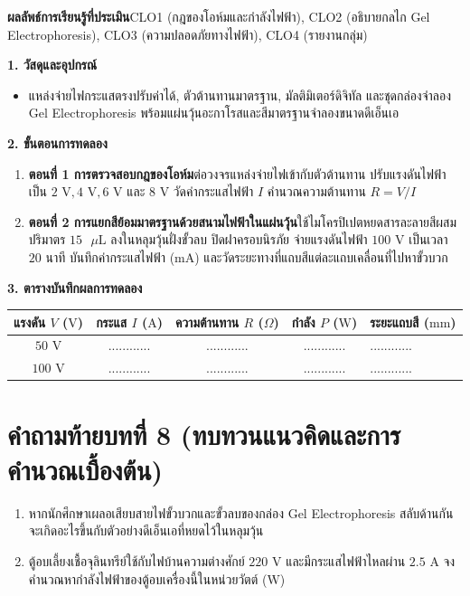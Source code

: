 \begin{labbox}
\noindent\textbf{ผลลัพธ์การเรียนรู้ที่ประเมิน}\quad CLO1 (กฎของโอห์มและกำลังไฟฟ้า), CLO2 (อธิบายกลไก Gel Electrophoresis), CLO3 (ความปลอดภัยทางไฟฟ้า), CLO4 (รายงานกลุ่ม)

\vspace{4pt}
\noindent\textbf{1. วัสดุและอุปกรณ์}
\begin{itemize}
    \item แหล่งจ่ายไฟกระแสตรงปรับค่าได้, ตัวต้านทานมาตรฐาน, มัลติมิเตอร์ดิจิทัล และชุดกล่องจำลอง Gel Electrophoresis พร้อมแผ่นวุ้นอะกาโรสและสีมาตรฐานจำลองขนาดดีเอ็นเอ
\end{itemize}

\noindent\textbf{2. ขั้นตอนการทดลอง}
\begin{enumerate}
    \item \textbf{ตอนที่ 1 การตรวจสอบกฎของโอห์ม}\quad ต่อวงจรแหล่งจ่ายไฟเข้ากับตัวต้านทาน ปรับแรงดันไฟฟ้าเป็น $2\text{ V}, 4\text{ V}, 6\text{ V}$ และ $8\text{ V}$ วัดค่ากระแสไฟฟ้า $I$ คำนวณความต้านทาน $R = V/I$
    \item \textbf{ตอนที่ 2 การแยกสีย้อมมาตรฐานด้วยสนามไฟฟ้าในแผ่นวุ้น}\quad ใช้ไมโครปิเปตหยดสารละลายสีผสมปริมาตร $15\text{ }\mu\text{L}$ ลงในหลุมวุ้นฝั่งขั้วลบ ปิดฝาครอบนิรภัย จ่ายแรงดันไฟฟ้า $100\text{ V}$ เป็นเวลา $20$ นาที บันทึกค่ากระแสไฟฟ้า ($\text{mA}$) และวัดระยะทางที่แถบสีแต่ละแถบเคลื่อนที่ไปหาขั้วบวก
\end{enumerate}

\noindent\textbf{3. ตารางบันทึกผลการทดลอง}
\begin{center}
\footnotesize\setlength{\tabcolsep}{3.5pt}
\begin{tabularx}{\linewidth}{c c c c >{\raggedright\arraybackslash}X}
\toprule
\textbf{แรงดัน $V$ ($\text{V}$)} & \textbf{กระแส $I$ ($\text{A}$)} & \textbf{ความต้านทาน $R$ ($\Omega$)} & \textbf{กำลัง $P$ ($\text{W}$)} & \textbf{ระยะแถบสี ($\text{mm}$)} \\
\midrule
$50\text{ V}$ & ............ & ............ & ............ & ............ \\
$100\text{ V}$ & ............ & ............ & ............ & ............ \\
\bottomrule
\end{tabularx}
\end{center}
\end{labbox}

\section*{คำถามท้ายบทที่ 8 (ทบทวนแนวคิดและการคำนวณเบื้องต้น)}
\begin{enumerate}
    \item หากนักศึกษาเผลอเสียบสายไฟขั้วบวกและขั้วลบของกล่อง Gel Electrophoresis สลับด้านกัน จะเกิดอะไรขึ้นกับตัวอย่างดีเอ็นเอที่หยดไว้ในหลุมวุ้น
    \item ตู้อบเลี้ยงเชื้อจุลินทรีย์ใช้กับไฟบ้านความต่างศักย์ $220\text{ V}$ และมีกระแสไฟฟ้าไหลผ่าน $2.5\text{ A}$ จงคำนวณหากำลังไฟฟ้าของตู้อบเครื่องนี้ในหน่วยวัตต์ ($\text{W}$)
\end{enumerate}
